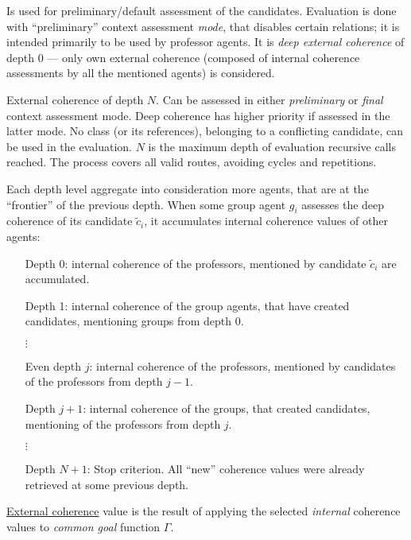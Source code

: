\documentclass[../../ThesisDoc]{subfiles}
\begin{document}

Is used for preliminary/default assessment of the candidates.
Evaluation is done with ``preliminary'' context assessment \emph{mode}, that
disables certain relations; it is intended primarily to be used by professor agents.
It is \emph{deep external coherence} of depth 0 --- only own external coherence
(composed of internal coherence assessments by all the mentioned agents) is
considered.



External coherence of depth $N$. Can be assessed in either \emph{preliminary}
or \emph{final} context assessment mode. Deep coherence has higher priority if
assessed in the latter mode.
No class (or its references), belonging to a conflicting candidate, can be used in
the evaluation.
$N$ is the maximum depth of evaluation recursive calls reached.
The process covers all valid routes, avoiding cycles and repetitions.

Each depth level aggregate into consideration more agents, that are at the
``frontier'' of the previous depth. When some group agent $g_i$ assesses the
deep coherence of its candidate $\tilde{c}_i$, it accumulates internal
coherence values of other agents:
\begin{itemize}[leftmargin=2.5cm]
  \item[Depth 0:] internal coherence of the professors,
            mentioned by candidate $\tilde{c}_i$ are accumulated.
  \item[Depth 1:] internal coherence of the group agents,
            that have created candidates, mentioning groups from depth 0.
  \item[$\vdots$]
  \item[Even depth $j$:] internal coherence of the professors,
            mentioned by candidates of the professors from depth $j-1$.
  \item[Depth $j+1$:] internal coherence of the groups,
            that created candidates, mentioning of the professors from depth $j$.
  \item[$\vdots$]
  \item[Depth $N+1$:] Stop criterion.
            All ``new'' coherence values were already retrieved at some previous depth.
\end{itemize}

\noindent
\underline{External coherence} value is the result of applying the selected
\emph{internal} coherence values to \emph{common goal} function $\Gamma$.
\end{document}
